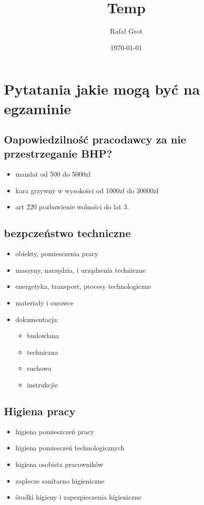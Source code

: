 \documentclass[11pt]{article}
\author{Rafał Grot}
\date{\today}
\title{Temp}
\begin{document}
\maketitle
\tableofcontents

\section{Pytatania jakie mogą być na egzaminie}
\label{sec:orge205677}
\subsection{Oapowiedzilność pracodawcy za nie przestrzeganie BHP?}
\label{sec:org1e5eb9c}
\begin{itemize}
\item mandat od 500 do 5000zł
\item kara grzywny w wysokości od 1000zł do 30000zł
\item art 220 pozbawienie wolności do lat 3.
\end{itemize}
\subsection{bezpczeństwo techniczne}
\label{sec:orgfeadbd3}
\begin{itemize}
\item obiekty, pomiesczenia pracy
\item maszyny, narzędzia, i urządzenia techniczne
\item energetyka, transport, procesy technologiczne
\item materiały i surowce
\item dokumentacja:
\begin{itemize}
\item budowlana
\item techniczna
\item ruchowa
\item instrukcjie
\end{itemize}
\end{itemize}
\subsection{Higiena pracy}
\label{sec:orgc2beeca}
\begin{itemize}
\item higiena pomieszczeń pracy
\item higiena pomiesczeń technologicznych
\item higiena osobista pracowników
\item zaplecze sanitarno higieniczne
\item środki higieny i zapezpieczenia higieniczne
\end{itemize}
\end{document}
